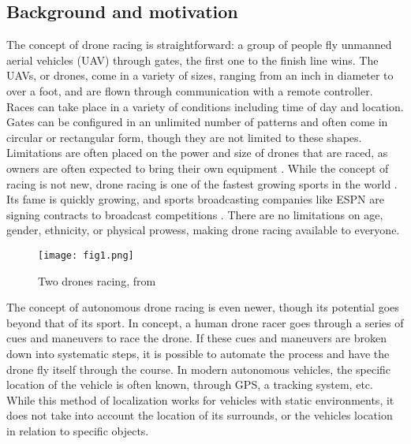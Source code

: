 \documentclass[onecolumn,10pt]{IEEEtran}
\begin{document}
\subsection{Background and motivation}
    The concept of drone racing is straightforward: a group of people fly unmanned aerial vehicles (UAV) through gates, the first one to the finish line wins. The UAVs, or drones, come in a variety of sizes, ranging from an inch in diameter to over a foot, and are flown through communication with a remote controller. Races can take place in a variety of conditions including time of day and location. Gates can be configured in an unlimited number of patterns and often come in circular or rectangular form, though they are not limited to these shapes. Limitations are often placed on the power and size of drones that are raced, as owners are often expected to bring their own equipment \cite{redbull2018drone}. While the concept of racing is not new, drone racing is one of the fastest growing sports in the world \cite{condliffe2016is}. Its fame is quickly growing, and sports broadcasting companies like ESPN are signing contracts to broadcast competitions \cite{marshall2017espn}. There are no limitations on age, gender, ethnicity, or physical prowess, making drone racing available to everyone.
\begin{figure}[hb]
\begin{center}
\texttt{[image: fig1.png]}
\end{center}
\caption{Two drones racing, from \cite{someone}}
\label{fig:1}
\end{figure}

The concept of autonomous drone racing is even newer, though its potential goes beyond that of its sport. In concept, a human drone racer goes through a series of cues and maneuvers to race the drone. If these cues and maneuvers are broken down into systematic steps, it is possible to automate the process and have the drone fly itself through the course. In modern autonomous vehicles, the specific location of the vehicle is often known, through GPS, a tracking system, etc. While this method of localization works for vehicles with static environments, it does not take into account the location of its surrounds, or the vehicles location in relation to specific objects. 
\end{document}
